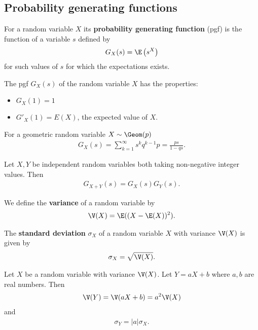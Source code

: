 \documentclass{article}
\begin{document}
\subsection{Probability generating functions}
\begin{definition}
	For a random variable $X$ its \textbf{probability generating function} (pgf) is the function of a variable
	$s$ defined by
	\begin{align*}
		G_X(s) = \E\left(s^X\right)
	\end{align*}
	for such values of $s$ for which the expectations exists.
\end{definition}
\begin{theorem}
	The pgf $G_X(s)$ of the random variable $X$ has the properties:
	\begin{itemize}
		\item $G_X(1) = 1$
		\item $G'_X(1)=E(X)$, the expected value of $X$.
	\end{itemize}
\end{theorem}
\begin{lemma}
	For a geometric random variable $X\sim \Geom(p)$
	\begin{align*}
		G_X(s) = \sum_{k=1}^\infty s^k q^{k-1}p
		= \frac{ps}{1-qs}.
	\end{align*}
\end{lemma}
\begin{theorem}
	Let $X,Y$ be independent random variables both taking
	non-negative integer values. Then
	\begin{align*}
		G_{X+Y}(s) = G_X(s)G_Y(s).
	\end{align*}
\end{theorem}
\begin{definition}
	We define the \textbf{variance} of a random variable by
	\begin{align*}
		\V(X) = \E((X-\E(X))^2).
	\end{align*}
\end{definition}
\begin{definition}
	The \textbf{standard deviation} $\sigma_X$ of a random
	variable $X$ with variance $\V(X)$ is given by
	\begin{align*}
		\sigma_X = \sqrt{\V(X)}.
	\end{align*}
\end{definition}
\begin{theorem}
	Let $X$ be a random variable with variance $\V(X)$.
	Let $Y= a X + b$ where $a,b$ are real numbers.
	Then
	\begin{align*}
		\V(Y) = \V(aX+b) = a^2\V(X)
	\end{align*}
	and
	\begin{align*}
		\sigma_Y = |a|\sigma_X.
	\end{align*}
\end{theorem}
\end{document}
